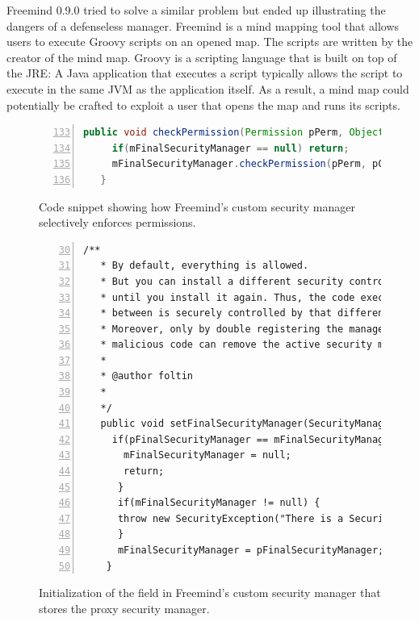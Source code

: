 \documentclass{sig-alternate}
\begin{document}
Freemind 0.9.0 tried to solve a similar problem but ended up illustrating
the dangers of a defenseless manager. Freemind is a mind mapping tool
that allows users to execute Groovy scripts on an opened map. The
scripts are written by the creator of the mind map. Groovy is a scripting
language that is built on top of the JRE: A Java application that
executes a script typically allows the script to execute in the same
JVM as the application itself. As a result, a mind map could potentially
be crafted to exploit a user that opens the map and runs its scripts.
\begin{figure}
\begin{lstlisting}[language=Java,numbers=left,basicstyle={\scriptsize},breaklines=true,firstnumber=133,xrightmargin={0.1cm},numbersep={-10pt}]
   public void checkPermission(Permission pPerm, Object pContext) {
     if(mFinalSecurityManager == null) return; 		
     mFinalSecurityManager.checkPermission(pPerm, pContext); 	
   }
\end{lstlisting}


\caption{Code snippet showing how Freemind's custom security manager selectively
enforces permissions.}
\label{fig:Security-Checks-Freemind}
\end{figure}
\begin{figure}
\begin{lstlisting}[numbers=left,basicstyle={\scriptsize},breaklines=true,firstnumber=30,xrightmargin={0.1cm},numbersep={-10pt}]
  /**  
   * By default, everything is allowed.  
   * But you can install a different security controller once,  
   * until you install it again. Thus, the code executed in   
   * between is securely controlled by that different security manager.  
   * Moreover, only by double registering the manager is removed. So, no   
   * malicious code can remove the active security manager.  
   *   
   * @author foltin  
   *  
   */
   public void setFinalSecurityManager(SecurityManager pFinalSecurityManager) {
	 if(pFinalSecurityManager == mFinalSecurityManager){
       mFinalSecurityManager = null;
	   return;
      } 		
      if(mFinalSecurityManager != null) {
      throw new SecurityException("There is a SecurityManager installed already."); 		
      } 		
      mFinalSecurityManager = pFinalSecurityManager;
    }	
\end{lstlisting}


\caption{Initialization of the field in Freemind's custom security manager
that stores the proxy security manager.}
\label{fig:Freemind-Security-Manager}
\end{figure}
\end{document}
